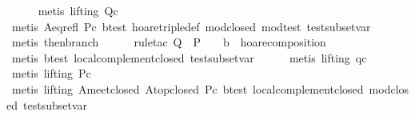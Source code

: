 \begin{isabellebody}
\ \ \ \ \isamarkupfalse%
\ {}metis\ {}lifting{}\ Qc{}\isanewline
\ \ \ \ \isamarkupfalse%
\ {}metis\ A{}eq{}refl\ Pc\ b{}test\ hoare{}triple{}def\ mod{}closed\ mod{}test\ test{}subset{}var{}\isanewline
\ \ \ \ \isamarkupfalse%
\ {}metis\ then{}branch{}\isanewline
\ \ \ \ \isamarkupfalse%
\ {}rule{}tac\ Q\ {}\ {}P\ {}\ {}\ {}\ {}b{}\ \ hoare{}composition{}\isanewline
\ \ \ \ \isamarkupfalse%
\ {}metis\ b{}test\ local{}complement{}closed\ test{}subset{}var{}\isanewline
\ \ \ \ \isamarkupfalse%
\ {}metis\ {}lifting{}\ qc{}\isanewline
\ \ \ \ \isamarkupfalse%
\ {}metis\ {}lifting{}\ Pc{}\isanewline
\ \ \ \ \isamarkupfalse%
\ {}metis\ {}lifting{}\ A{}meet{}closed\ A{}top{}closed\ Pc\ b{}test\ local{}complement{}closed\ mod{}closed\ test{}subset{}var{}\isanewline

\end{isabellebody}
